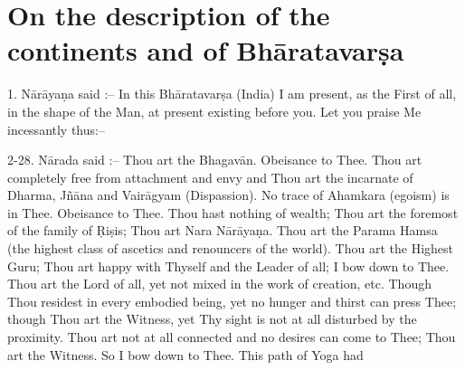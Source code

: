 \chapter{On the description of the continents and of Bh\=aratavar\d{s}a}

1. N\=ar\=aya\d{n}a said :-- In this Bh\=aratavar\d{s}a (India) I am present, as the First of all, in the shape of the Man, at present existing before you. Let you praise Me incessantly thus:--

2-28. N\=arada said :-- Thou art the Bhagav\=an. Obeisance to Thee. Thou art completely free from attachment and envy and Thou art the incarnate of Dharma, J\~n\=ana and Vair\=agyam (Dispassion). No trace of Ahamkara (egoism) is in Thee. Obeisance to Thee. Thou hast nothing of wealth; Thou art the foremost of the family of \d{R}i\d{s}is; Thou art Nara N\=ar\=aya\d{n}a. Thou art the Parama Hamsa (the highest class of ascetics and renouncers of the world). Thou art the Highest Guru; Thou art happy with Thyself and the Leader of all; I bow down to Thee. Thou art the Lord of all, yet not mixed in the work of creation, etc. Though Thou residest in every embodied being, yet no hunger and thirst can press Thee; though Thou art the Witness, yet Thy sight is not at all disturbed by the proximity. Thou art not at all connected and no desires can come to Thee; Thou art the Witness. So I bow down to Thee. This path of Yoga had

